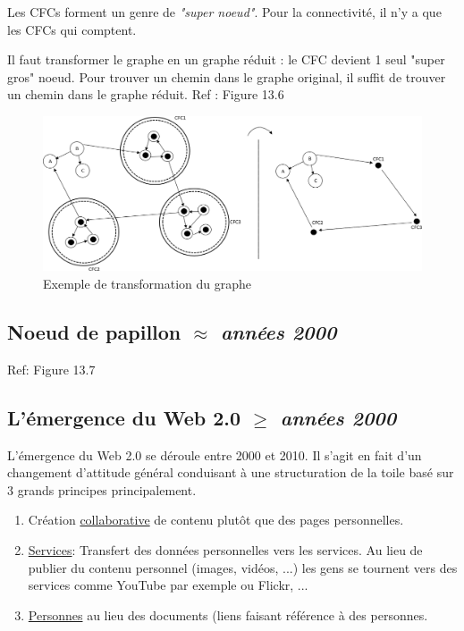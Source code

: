 \documentclass{article}
\begin{document}
Les CFCs forment un genre de \textit{"super noeud"}. Pour la connectivité, il n'y a que les CFCs qui comptent.

\vspace{0.3cm}

Il faut transformer le graphe en un graphe réduit : le CFC devient 1 seul "super gros" noeud. Pour trouver un chemin dans le graphe original, il suffit de trouver un chemin dans le graphe réduit. Ref : Figure 13.6
\vspace{0.3cm}

\begin{figure}[!h]
\centering
\includegraphics[width=0.95\linewidth]{images/23_schema2.png}
\caption{Exemple de transformation du graphe}
\label{fig:cfc2}
\end{figure}

\subsection{Noeud de papillon \textit{ $\approx$ années 2000}}
Ref: Figure 13.7


\subsection{L'émergence du Web 2.0  \textit{$\ge$ années 2000}}
L'émergence du Web 2.0 se déroule entre 2000 et 2010. Il s'agit en fait d'un changement d'attitude général conduisant à une structuration de la toile basé sur 3 grands principes principalement. 
\begin{enumerate}
    \item Création \underline{collaborative} de contenu plutôt que des pages personnelles.
    
    \item \underline{Services}: Transfert des données personnelles vers les services. Au lieu de publier du contenu personnel (images, vidéos, ...) les gens se tournent vers des services comme YouTube par exemple ou Flickr, ...
    \item \underline{Personnes} au lieu des documents (liens faisant référence à des personnes.
\end{enumerate} 
\end{document}
